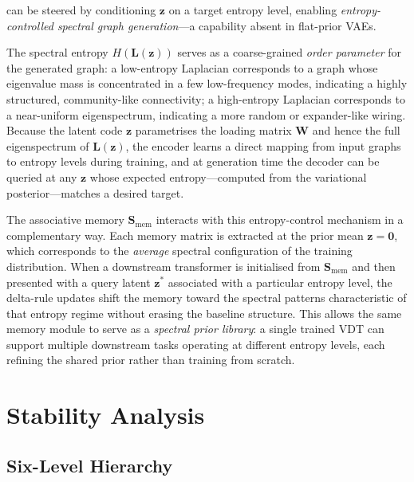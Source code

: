 \documentclass[11pt,a4paper]{article}
\newcommand{\Lmat}{\mathbf{L}}
\newcommand{\Smat}{\mathbf{S}}
\newcommand{\Wmat}{\mathbf{W}}
\begin{document}
can be steered by conditioning $\mathbf{z}$ on a target entropy level,
enabling \emph{entropy-controlled spectral graph generation}---a capability
absent in flat-prior VAEs.

The spectral entropy $H(\Lmat(\mathbf{z}))$ serves as a coarse-grained
\emph{order parameter} for the generated graph: a low-entropy Laplacian
corresponds to a graph whose eigenvalue mass is concentrated in a few
low-frequency modes, indicating a highly structured, community-like
connectivity; a high-entropy Laplacian corresponds to a near-uniform
eigenspectrum, indicating a more random or expander-like wiring.
Because the latent code $\mathbf{z}$ parametrises the loading matrix $\Wmat$
and hence the full eigenspectrum of $\Lmat(\mathbf{z})$, the encoder learns
a direct mapping from input graphs to entropy levels during training,
and at generation time the decoder can be queried at any
$\mathbf{z}$ whose expected entropy---computed from the variational
posterior---matches a desired target.

The associative memory $\Smat_{\mathrm{mem}}$ interacts with this
entropy-control mechanism in a complementary way.  Each memory matrix is
extracted at the prior mean $\mathbf{z}=\mathbf{0}$, which corresponds to
the \emph{average} spectral configuration of the training distribution.
When a downstream transformer is initialised from $\Smat_{\mathrm{mem}}$
and then presented with a query latent $\mathbf{z}^*$ associated with a
particular entropy level, the delta-rule updates shift the memory toward
the spectral patterns characteristic of that entropy regime without
erasing the baseline structure.
This allows the same memory module to serve as a \emph{spectral prior
library}: a single trained VDT can support multiple downstream tasks
operating at different entropy levels, each refining the shared prior
rather than training from scratch.

\section{Stability Analysis}
\label{sec:stability}

\subsection{Six-Level Hierarchy}
\label{sec:stability:hierarchy}
\end{document}
